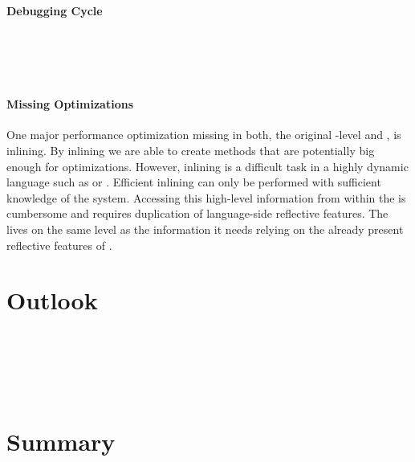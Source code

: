 \paragraph{Debugging Cycle}
 \\
 \\
 \\

\paragraph{Missing Optimizations}
One major performance optimization missing in both, the original \PH \VM-level \JIT and \NBJ, is inlining. 
By inlining we are able to create methods that are potentially big enough for optimizations.
However, inlining is a difficult task in a highly dynamic language such as \ST or \Self \cite{Cham89a}. 
Efficient inlining can only be performed with sufficient knowledge of the system. 
Accessing this high-level information from within the \VM is cumbersome and requires duplication of language-side reflective features.
The \JIT lives on the same level as the information it needs relying on the already present reflective features of \ST.


\section{Outlook}

 \\
 \\
 \\
 \\

\section{Summary}


